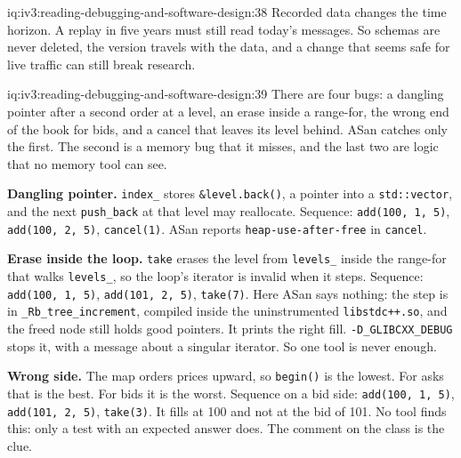 \begin{solution}{iq:iv3:reading-debugging-and-software-design:38}
Recorded data changes the time horizon. A replay in five years must still read today's messages. So schemas are never deleted, the version travels with the data, and a change that seems safe for live traffic can still break research.


\end{solution}

\begin{solution}{iq:iv3:reading-debugging-and-software-design:39}
There are four bugs: a dangling pointer after a second order at a level, an erase inside a range-for, the wrong end of the book for bids, and a cancel that leaves its level behind. ASan catches only the first. The second is a memory bug that it misses, and the last two are logic that no memory tool can see.

\textbf{Dangling pointer.} \texttt{index\_} stores \texttt{\&level.back()}, a pointer into a \texttt{std::vector}, and the next \texttt{push\_back} at that level may reallocate. Sequence: \texttt{add(100, 1, 5)}, \texttt{add(100, 2, 5)}, \texttt{cancel(1)}. ASan reports \texttt{heap-use-after-free} in \texttt{cancel}.

\textbf{Erase inside the loop.} \texttt{take} erases the level from \texttt{levels\_} inside the range-for that walks \texttt{levels\_}, so the loop's iterator is invalid when it steps. Sequence: \texttt{add(100, 1, 5)}, \texttt{add(101, 2, 5)}, \texttt{take(7)}. Here ASan says nothing: the step is in \texttt{\_Rb\_tree\_increment}, compiled inside the uninstrumented \texttt{libstdc++.so}, and the freed node still holds good pointers. It prints the right fill. \texttt{-D\_GLIBCXX\_DEBUG} stops it, with a message about a singular iterator. So one tool is never enough.

\textbf{Wrong side.} The map orders prices upward, so \texttt{begin()} is the lowest. For asks that is the best. For bids it is the worst. Sequence on a bid side: \texttt{add(100, 1, 5)}, \texttt{add(101, 2, 5)}, \texttt{take(3)}. It fills at 100 and not at the bid of 101. No tool finds this: only a test with an expected answer does. The comment on the class is the clue.


\end{solution}
